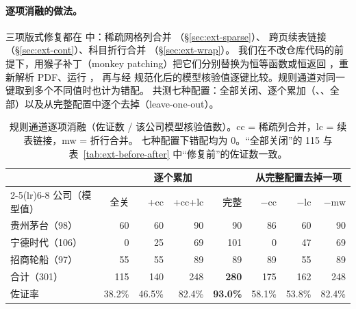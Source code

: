 \paragraph{逐项消融的做法。}三项版式修复都在  中：稀疏网格列合并 （\S\ref{sec:ext-sparse}）、
跨页续表链接 （\S\ref{sec:ext-cont}）、科目折行合并 （\S\ref{sec:ext-wrap}）。
我们在不改仓库代码的前提下，用猴子补丁（monkey patching）把它们分别替换为恒等函数或恒返回 ，重新解析 PDF、运行 ，
再与经  规范化后的模型核验值逐键比较。规则通道对同一键取到多个不同值时也计为错配。
共测七种配置：全部关闭、逐个累加（、、全部）以及从完整配置中逐个去掉（leave-one-out）。

\begin{table}[t]
\centering
\caption{规则通道逐项消融（佐证数 / 该公司模型核验值数）。cc = 稀疏列合并，lc = 续表链接，mw = 折行合并。
七种配置下错配均为 0。“全部关闭”的 115 与表~\ref{tab:ext-before-after} 中“修复前”的佐证数一致。}
\label{tab:exp-ext-ablation}
\small
\begin{tabular}{@{}lrrrrrrr@{}}
\toprule
 & \multicolumn{4}{c}{逐个累加} & \multicolumn{3}{c}{从完整配置去掉一项} \\
\cmidrule(lr){2-5}\cmidrule(lr){6-8}
公司（模型值） & 全关 & +cc & +cc+lc & 完整 & $-$cc & $-$lc & $-$mw \\
\midrule
贵州茅台（98） & 60 & 60 & 90 & 90 & 86 & 60 & 90 \\
宁德时代（106） & 0 & 25 & 69 & 101 & 0 & 47 & 69 \\
招商轮船（97） & 55 & 55 & 89 & 89 & 89 & 55 & 89 \\
\midrule
合计（301） & 115 & 140 & 248 & \textbf{280} & 175 & 162 & 248 \\
佐证率 & 38.2\% & 46.5\% & 82.4\% & \textbf{93.0\%} & 58.1\% & 53.8\% & 82.4\% \\
\bottomrule
\end{tabular}
\end{table}

